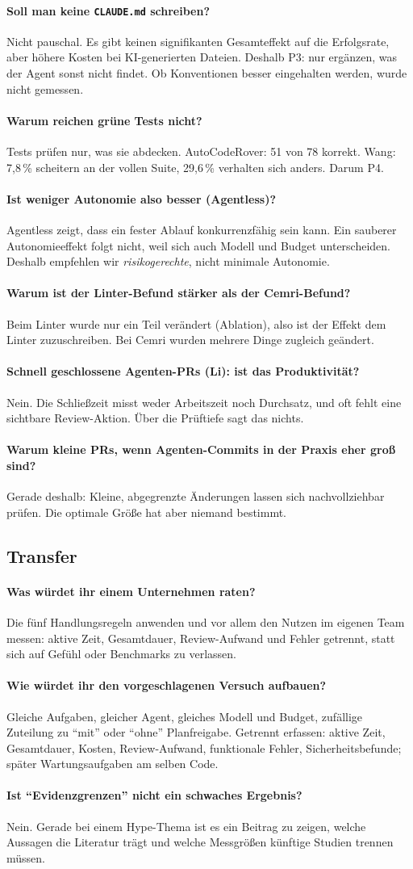 \documentclass[11pt,a4paper,parskip=half]{scrartcl}
\newcommand{\frage}[2]{\paragraph{#1}#2\par}
\begin{document}
\frage{Soll man keine \texttt{CLAUDE.md} schreiben?}{Nicht pauschal. Es gibt keinen signifikanten Gesamteffekt auf die Erfolgsrate, aber höhere Kosten bei KI-generierten Dateien. Deshalb P3: nur ergänzen, was der Agent sonst nicht findet. Ob Konventionen besser eingehalten werden, wurde nicht gemessen.}

\frage{Warum reichen grüne Tests nicht?}{Tests prüfen nur, was sie abdecken. AutoCodeRover: 51 von 78 korrekt. Wang: 7,8\,\% scheitern an der vollen Suite, 29,6\,\% verhalten sich anders. Darum P4.}

\frage{Ist weniger Autonomie also besser (Agentless)?}{Agentless zeigt, dass ein fester Ablauf konkurrenzfähig sein kann. Ein sauberer Autonomieeffekt folgt nicht, weil sich auch Modell und Budget unterscheiden. Deshalb empfehlen wir \emph{risikogerechte}, nicht minimale Autonomie.}

\frage{Warum ist der Linter-Befund stärker als der Cemri-Befund?}{Beim Linter wurde nur ein Teil verändert (Ablation), also ist der Effekt dem Linter zuzuschreiben. Bei Cemri wurden mehrere Dinge zugleich geändert.}

\frage{Schnell geschlossene Agenten-PRs (Li): ist das Produktivität?}{Nein. Die Schließzeit misst weder Arbeitszeit noch Durchsatz, und oft fehlt eine sichtbare Review-Aktion. Über die Prüftiefe sagt das nichts.}

\frage{Warum kleine PRs, wenn Agenten-Commits in der Praxis eher groß sind?}{Gerade deshalb: Kleine, abgegrenzte Änderungen lassen sich nachvollziehbar prüfen. Die optimale Größe hat aber niemand bestimmt.}

\subsection*{Transfer}
\frage{Was würdet ihr einem Unternehmen raten?}{Die fünf Handlungsregeln anwenden und vor allem den Nutzen im eigenen Team messen: aktive Zeit, Gesamtdauer, Review-Aufwand und Fehler getrennt, statt sich auf Gefühl oder Benchmarks zu verlassen.}

\frage{Wie würdet ihr den vorgeschlagenen Versuch aufbauen?}{Gleiche Aufgaben, gleicher Agent, gleiches Modell und Budget, zufällige Zuteilung zu \enquote{mit} oder \enquote{ohne} Planfreigabe. Getrennt erfassen: aktive Zeit, Gesamtdauer, Kosten, Review-Aufwand, funktionale Fehler, Sicherheitsbefunde; später Wartungsaufgaben am selben Code.}

\frage{Ist \enquote{Evidenzgrenzen} nicht ein schwaches Ergebnis?}{Nein. Gerade bei einem Hype-Thema ist es ein Beitrag zu zeigen, welche Aussagen die Literatur trägt und welche Messgrößen künftige Studien trennen müssen.}
\end{document}

